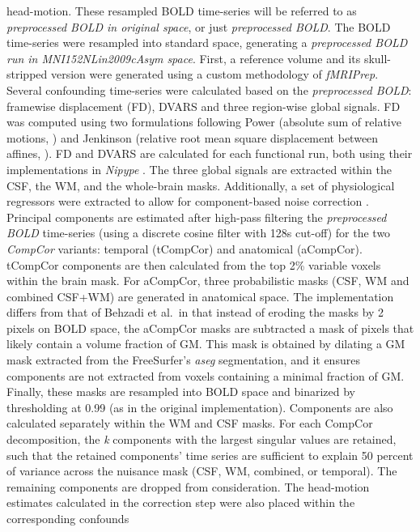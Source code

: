 \documentclass[]{article}
\begin{document}
\begin{description}
head-motion. These resampled BOLD time-series will be referred to as
\emph{preprocessed BOLD in original space}, or just \emph{preprocessed
BOLD}. The BOLD time-series were resampled into standard space,
generating a \emph{preprocessed BOLD run in MNI152NLin2009cAsym space}.
First, a reference volume and its skull-stripped version were generated
using a custom methodology of \emph{fMRIPrep}. Several confounding
time-series were calculated based on the \emph{preprocessed BOLD}:
framewise displacement (FD), DVARS and three region-wise global signals.
FD was computed using two formulations following Power (absolute sum of
relative motions, \citet{power_fd_dvars}) and Jenkinson (relative root
mean square displacement between affines, \citet{mcflirt}). FD and DVARS
are calculated for each functional run, both using their implementations
in \emph{Nipype} \citep[following the definitions by][]{power_fd_dvars}.
The three global signals are extracted within the CSF, the WM, and the
whole-brain masks. Additionally, a set of physiological regressors were
extracted to allow for component-based noise correction
\citep[\emph{CompCor},][]{compcor}. Principal components are estimated
after high-pass filtering the \emph{preprocessed BOLD} time-series
(using a discrete cosine filter with 128s cut-off) for the two
\emph{CompCor} variants: temporal (tCompCor) and anatomical (aCompCor).
tCompCor components are then calculated from the top 2\% variable voxels
within the brain mask. For aCompCor, three probabilistic masks (CSF, WM
and combined CSF+WM) are generated in anatomical space. The
implementation differs from that of Behzadi et al.~in that instead of
eroding the masks by 2 pixels on BOLD space, the aCompCor masks are
subtracted a mask of pixels that likely contain a volume fraction of GM.
This mask is obtained by dilating a GM mask extracted from the
FreeSurfer's \emph{aseg} segmentation, and it ensures components are not
extracted from voxels containing a minimal fraction of GM. Finally,
these masks are resampled into BOLD space and binarized by thresholding
at 0.99 (as in the original implementation). Components are also
calculated separately within the WM and CSF masks. For each CompCor
decomposition, the \emph{k} components with the largest singular values
are retained, such that the retained components' time series are
sufficient to explain 50 percent of variance across the nuisance mask
(CSF, WM, combined, or temporal). The remaining components are dropped
from consideration. The head-motion estimates calculated in the
correction step were also placed within the corresponding confounds

\end{description}
\end{document}
